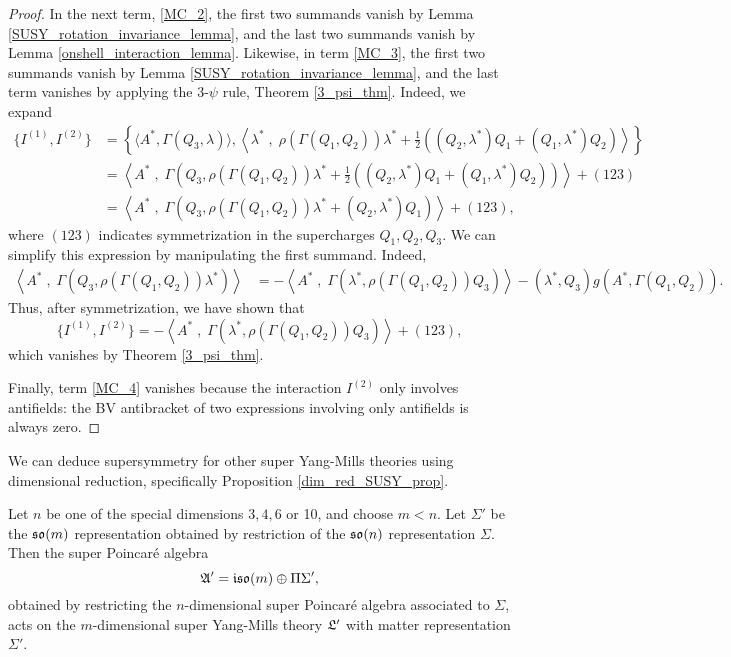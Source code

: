 \documentclass[10pt, oneside]{article}
\begin{document}
\begin{proof}
In the next term, \ref{MC_2}, the first two summands vanish by Lemma \ref{SUSY_rotation_invariance_lemma}, and the last two summands vanish by Lemma \ref{onshell_interaction_lemma}.  Likewise, in term \ref{MC_3}, the first two summands vanish by Lemma \ref{SUSY_rotation_invariance_lemma}, and the last term vanishes by applying the 3-$\psi$ rule, Theorem \ref{3_psi_thm}.  Indeed, we expand 
\begin{align*}
 \{I^{(1)}, I^{(2)}\}  &= \left\{\langle A^* , \Gamma(Q_3, \lambda)\rangle, \left\langle\lambda^* \;,\; \rho(\Gamma(Q_1,Q_2)) \lambda^* + \frac 12 \left((Q_2, \lambda^*)Q_1 + (Q_1, \lambda^*)Q_2\right)\right\rangle\right\}\\
 &= \left\langle A^*\;,\; \Gamma\left(Q_3, \rho(\Gamma(Q_1,Q_2)) \lambda^* + \frac 12 \left((Q_2, \lambda^*)Q_1 + (Q_1, \lambda^*)Q_2\right)\right)\right\rangle + (123) \\
 &= \left\langle A^*\;,\; \Gamma(Q_3, \rho(\Gamma(Q_1,Q_2)) \lambda^* + (Q_2, \lambda^*)Q_1)\right\rangle + (123),
\end{align*}
where $(123)$ indicates symmetrization in the supercharges $Q_1, Q_2, Q_3$.  We can simplify this expression by manipulating the first summand.  Indeed,
\begin{align*}
\left\langle A^*\;,\; \Gamma(Q_3, \rho(\Gamma(Q_1,Q_2)) \lambda^*)\right\rangle &= - \left\langle A^*\;,\; \Gamma(\lambda^*, \rho(\Gamma(Q_1,Q_2)) Q_3)\right\rangle - (\lambda^*, Q_3) g(A^*, \Gamma(Q_1,Q_2)).
\end{align*}
  Thus, after symmetrization, we have shown that
\[\{I^{(1)}, I^{(2)}\}= - \left\langle A^*\;,\; \Gamma(\lambda^*, \rho(\Gamma(Q_1,Q_2)) Q_3)\right\rangle + (123),\]
which vanishes by Theorem \ref{3_psi_thm}.

Finally, term \ref{MC_4} vanishes because the interaction $I^{(2)}$ only involves antifields: the BV antibracket of two expressions involving only antifields is always zero.
\end{proof}

We can deduce supersymmetry for other super Yang-Mills theories using dimensional reduction, specifically Proposition \ref{dim_red_SUSY_prop}.
\begin{corollary}
Let $n$ be one of the special dimensions $3,4,6$ or 10, and choose $m < n$.  Let $\Sigma'$ be the $\mathfrak{so}(m)$ representation obtained by restriction of the $\mathfrak{so}(n)$ representation $\Sigma$.  Then the super Poincar\'e algebra
\[\mathfrak{A}' = \mathfrak{iso}(m) \oplus \Pi \Sigma',\]
obtained by restricting the $n$-dimensional super Poincar\'e algebra associated to $\Sigma$, acts on the $m$-dimensional super Yang-Mills theory $\mathfrak{L}'$ with matter representation $\Sigma'$.
\end{corollary}
\end{document}

